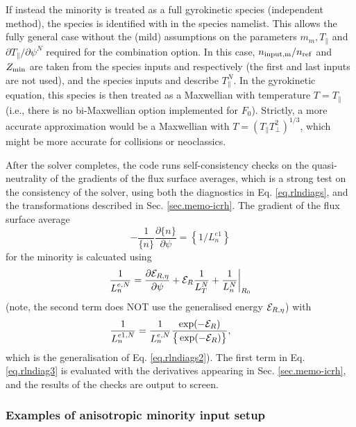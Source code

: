 If instead the minority is treated as a full gyrokinetic species (independent method), the species is identified with
 in the species namelist. This allows the fully general case without the (mild) 
assumptions on the parameters $m_m, T_\parallel$ and $\partial T_\parallel / \partial \psi^N$ required for 
the combination option.  In this case, $n_{\rm input,m}/n_{\rm ref}$ and $Z_{\rm min}$ are taken from the species inputs  and  respectively
(the first and last inputs  are not used), and the species inputs  and 
 describe $T_\parallel^N$. In the gyrokinetic equation, this species is then treated as a Maxwellian with temperature $T=T_\parallel$
(i.e., there is no bi-Maxwellian option implemented for $F_0$). Strictly, a more accurate approximation would be a Maxwellian with $T=(T_\parallel T_\perp^2)^{1/3}$, which might be more accurate for collisions or neoclassics.

After the solver completes, the code runs self-consistency checks on the quasi-neutrality of the gradients of the flux surface averages, which is a strong test on the consistency of the solver, using both the diagnostics in Eq. \ref{eq.rlndiags}, and the transformations described in Sec. \ref{sec.memo-icrh}.  The gradient of the flux surface average
\begin{equation}
-\frac{1}{\{n\}}\frac{\partial \{n\}}{\partial \psi} =  \left \{1/L_n^{e1}\right\}
\end{equation}
for the minority is calcuated using 
\begin{equation}
 {1 \over L_n^{e,N} } = {\partial {\cal E}_{R,\eta} \over \partial \psi} + 
{\cal E}_{R} {1 \over L^N_T}+  {1 \over L^N_n} \biggr|_{R_0}
\label{eq.rlndiag3}
\end{equation}
(note, the second term does NOT use the generalised energy $ {\cal E}_{R,\eta}$) 
with
\begin{equation}
 {1 \over L_n^{e1,N} } = {1 \over L_n^{e,N} } { \exp(-\mathcal{E}_R) \over
\big\{ \exp(-\mathcal{E}_R) \big\} }, \qquad
\end{equation}
which is the generalisation of Eq. \ref{eq.rlndiags2}).  The first term in Eq. \ref{eq.rlndiag3} is evaluated with the derivatives appearing in Sec. \ref{sec.memo-icrh}, 
and the results of the checks are output to screen. 

\pagebreak

\subsubsection{Examples of anisotropic minority input setup}

